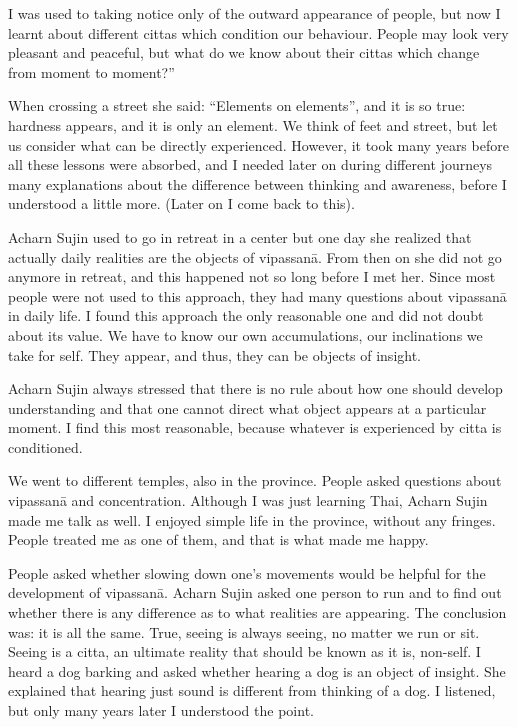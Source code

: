 I was used to taking notice only of the outward appearance of people, but now I learnt about different cittas which condition our behaviour. People may look very pleasant and peaceful, but what do we know about their cittas which change from moment to moment?''

When crossing a street she said: ``Elements on elements'', and it is so true: hardness appears, and it is only an element. We think of feet and street, but let us consider what can be directly experienced.
However, it took many years before all these lessons were absorbed, and I needed later on during different journeys many explanations about the difference between thinking and awareness, before I understood a little more. (Later on I come back to this).

Acharn Sujin used to go in retreat in a center but one day she realized that actually daily realities are the objects of vipassanā. From then on she did not go anymore in retreat, and this happened not so long before I met her. Since most people were not used to this approach, they had many questions about vipassanā in daily life. I found this approach the only reasonable one and did not doubt about its value. We have to know our own accumulations, our inclinations we take for self. They appear, and thus, they can be objects of insight.

Acharn Sujin always stressed that there is no rule about how one should develop understanding and that one cannot direct what object appears at a particular moment. I find this most reasonable, because whatever is experienced by citta is conditioned.

We went to different temples, also in the province. People asked questions about vipassanā and concentration. Although I was just learning Thai, Acharn Sujin made me talk as well. I enjoyed simple life in the province, without any fringes. People treated me as one of them, and that is what made me happy.

People asked whether slowing down one’s movements would be helpful for the development of vipassanā. Acharn Sujin asked one person to run and to find out whether there is any difference as to what realities are appearing. The conclusion was: it is all the same. True, seeing is always seeing, no matter we run or sit. Seeing is a citta, an ultimate reality that should be known as it is, non-self. I heard a dog barking and asked whether hearing a dog is an object of insight. She explained that hearing just sound is different from thinking of a dog. I listened, but only many years later I understood the point.

